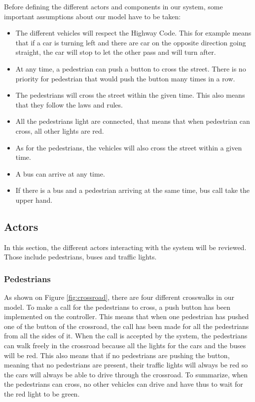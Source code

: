 Before defining the different actors and components in our system, some important assumptions about our model have to be taken:
\begin{itemize}
    \item The different vehicles will respect the Highway Code. This for example means that if a car is turning left and there are car on the opposite direction going straight, the car will stop to let the other pass and will turn after.
    \item At any time, a pedestrian can push a button to cross the street. There is no priority for pedestrian that would push the button many times in a row.
    \item The pedestrians will cross the street within the given time. This also means that they follow the laws and rules.
    \item All the pedestrians light are connected, that means that when pedestrian can cross, all other lights are red.
    \item As for the pedestrians, the vehicles will also cross the street within a given time.
    \item A bus can arrive at any time.
    \item If there is a bus and a pedestrian arriving at the same time, bus call take the upper hand.
\end{itemize}

\subsection{Actors}
In this section, the different actors interacting with the system will be reviewed. Those include pedestrians, buses and traffic lights.

\subsubsection{Pedestrians}
As shown on Figure \ref{fig:crossroad}, there are four different crosswalks in our model.  To make a call for the pedestrians to cross, a push button has been implemented on the controller. This means that when one pedestrian has pushed one of the button of the crossroad, the call has been made for all the pedestrians from all the sides of it. When the call is accepted by the system, the pedestrians can walk freely in the crossroad because all the lights for the cars and the buses will be red. This also means that if no pedestrians are pushing the button, meaning that no pedestrians are present, their traffic lights will always be red so the cars will always be able to drive through the crossroad.
To summarize, when the pedestrians can cross, no other vehicles can drive and have thus to wait for the red light to be green. 

